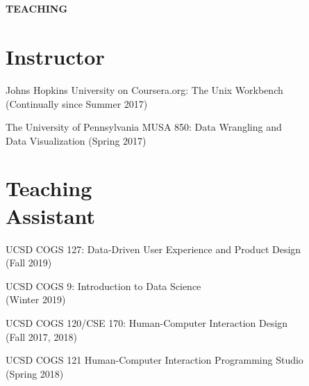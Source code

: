 
\section{} \textbf{TEACHING} \vspace{-0.05in}

\section{Instructor}

\begin{innerlist}
\item Johns Hopkins University on Coursera.org: The Unix Workbench \\ (Continually since Summer 2017)
\item The University of Pennsylvania MUSA 850: Data Wrangling and \\ Data Visualization (Spring 2017)
\end{innerlist}

\section{Teaching\\Assistant}

\begin{innerlist}
\item UCSD COGS 127: Data-Driven User Experience and Product Design  \\ (Fall 2019)
\item UCSD COGS 9: Introduction to Data Science  \\ (Winter 2019)
\item UCSD COGS 120/CSE 170: Human-Computer Interaction Design \\ (Fall 2017, 2018)
\item UCSD COGS 121 Human-Computer Interaction Programming Studio \\ (Spring 2018)
\end{innerlist}

